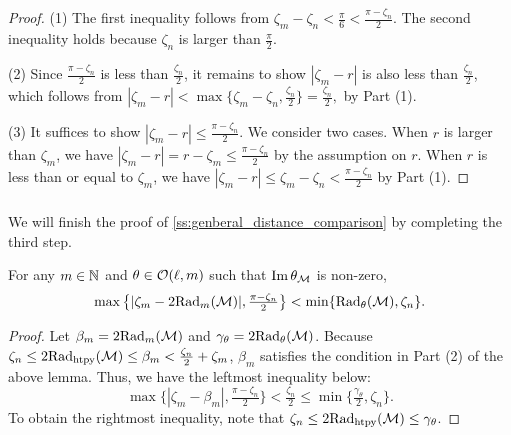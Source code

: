 \begin{proof}
    	(1) The first inequality follows from $\zeta_m - \zeta_n < \tfrac{\pi}{6} < \tfrac{\pi - \zeta_n}{2}$.
        The second inequality holds because $\zeta_n$ is larger than $\tfrac{\pi}{2}$.

        (2) Since $\tfrac{\pi - \zeta_n}{2}$ is less than $\tfrac{\zeta_n}{2}$, it remains to show $|\zeta_m  - r |$ is also less than $\tfrac{\zeta_n}{2}$, which follows from
    	\(
    	|\zeta_m  - r | < \max\big\{\zeta_m - \zeta_n, \tfrac{\zeta_n}{2}\big\} = \tfrac{\zeta_n}{2},
    	\) by Part (1).

    	(3) %
        It suffices to show $|\zeta_m  - r | \leq \tfrac{\pi - \zeta_n}{2}$.
        We consider two cases.
        When $r$ is larger than $\zeta_m$, we have
    	$|\zeta_m  - r | = r - \zeta_m \leq
        \tfrac{\pi - \zeta_n}{2}
    	$ by the assumption on $r$.
    	When $r$ is less than or equal to $\zeta_m$, we have
    	\(
    	|\zeta_m  - r | \leq \zeta_m - \zeta_n
    	< \tfrac{\pi - \zeta_n}{2}
    	\) by Part (1).
\end{proof}

\subsubsection{}
\label{sss:comparison_lemma_zeta_n}

We will finish the proof of \cref{ss:genberal_distance_comparison} by completing the third step.

\medskip \lemma
For any $m \in \mathbb{N}$ and $\theta \in \mathcal{O}(\ell, m)$ such that $\operatorname{Im} \theta_{\mathcal{M}}$ is non-zero,
\[\max\big\{|\zeta_m  - 2\mathrm{Rad}_{m}(\mathcal{M}) |, \tfrac{\pi - \zeta_n}{2}\big\} < \min\{\mathrm{Rad}_{\theta}(\mathcal{M}), \zeta_n\}.\]
\begin{proof}
    Let $\beta_m = 2\mathrm{Rad}_{m}(\mathcal{M})$ and $\gamma_\theta = 2\mathrm{Rad}_{\theta}(\mathcal{M})$.
    Because \(\zeta_n \leq 2\mathrm{Rad}_{\mathrm{htpy}}(\mathcal{M}) \leq \beta_m < \tfrac{\zeta_n}{2} + \zeta_m\), $\beta_m$ satisfies the condition in Part (2) of the above lemma.
    Thus, we have the leftmost inequality below:
    \[
    \max\big\{|\zeta_m - \beta_m|, \tfrac{\pi - \zeta_n}{2}\big\} < \tfrac{\zeta_n}{2}
    \leq
    \min\big\{\tfrac{\gamma_\theta}{2}, \zeta_n\big\}.
    \]
    To obtain the rightmost inequality, note that \(\zeta_n \leq 2\mathrm{Rad}_{\mathrm{htpy}}(\mathcal{M}) \leq \gamma_\theta\).
\end{proof}

